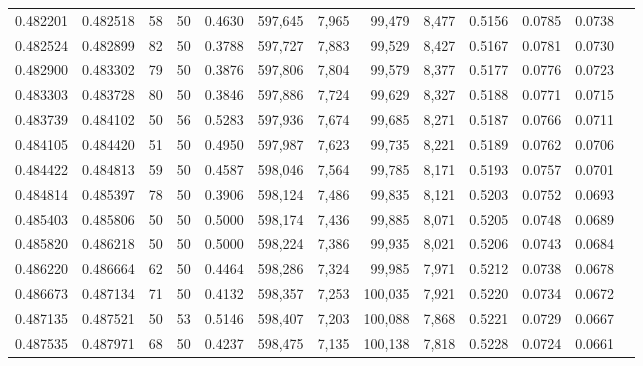 \begin{tabular}{rrrrrrrrrrrrr}
0.482201 & 0.482518 &    58 &  50 &                                     0.4630 & 597,645 &   7,965 &  99,479 &   8,477 & 0.5156 & 0.0785 & 0.0738 \\
0.482524 & 0.482899 &    82 &  50 &                                     0.3788 & 597,727 &   7,883 &  99,529 &   8,427 & 0.5167 & 0.0781 & 0.0730 \\
0.482900 & 0.483302 &    79 &  50 &                                     0.3876 & 597,806 &   7,804 &  99,579 &   8,377 & 0.5177 & 0.0776 & 0.0723 \\
0.483303 & 0.483728 &    80 &  50 &                                     0.3846 & 597,886 &   7,724 &  99,629 &   8,327 & 0.5188 & 0.0771 & 0.0715 \\
0.483739 & 0.484102 &    50 &  56 &                                     0.5283 & 597,936 &   7,674 &  99,685 &   8,271 & 0.5187 & 0.0766 & 0.0711 \\
0.484105 & 0.484420 &    51 &  50 &                                     0.4950 & 597,987 &   7,623 &  99,735 &   8,221 & 0.5189 & 0.0762 & 0.0706 \\
0.484422 & 0.484813 &    59 &  50 &                                     0.4587 & 598,046 &   7,564 &  99,785 &   8,171 & 0.5193 & 0.0757 & 0.0701 \\
0.484814 & 0.485397 &    78 &  50 &                                     0.3906 & 598,124 &   7,486 &  99,835 &   8,121 & 0.5203 & 0.0752 & 0.0693 \\
0.485403 & 0.485806 &    50 &  50 &                                     0.5000 & 598,174 &   7,436 &  99,885 &   8,071 & 0.5205 & 0.0748 & 0.0689 \\
0.485820 & 0.486218 &    50 &  50 &                                     0.5000 & 598,224 &   7,386 &  99,935 &   8,021 & 0.5206 & 0.0743 & 0.0684 \\
0.486220 & 0.486664 &    62 &  50 &                                     0.4464 & 598,286 &   7,324 &  99,985 &   7,971 & 0.5212 & 0.0738 & 0.0678 \\
0.486673 & 0.487134 &    71 &  50 &                                     0.4132 & 598,357 &   7,253 & 100,035 &   7,921 & 0.5220 & 0.0734 & 0.0672 \\
0.487135 & 0.487521 &    50 &  53 &                                     0.5146 & 598,407 &   7,203 & 100,088 &   7,868 & 0.5221 & 0.0729 & 0.0667 \\
0.487535 & 0.487971 &    68 &  50 &                                     0.4237 & 598,475 &   7,135 & 100,138 &   7,818 & 0.5228 & 0.0724 & 0.0661 \\

\end{tabular}
